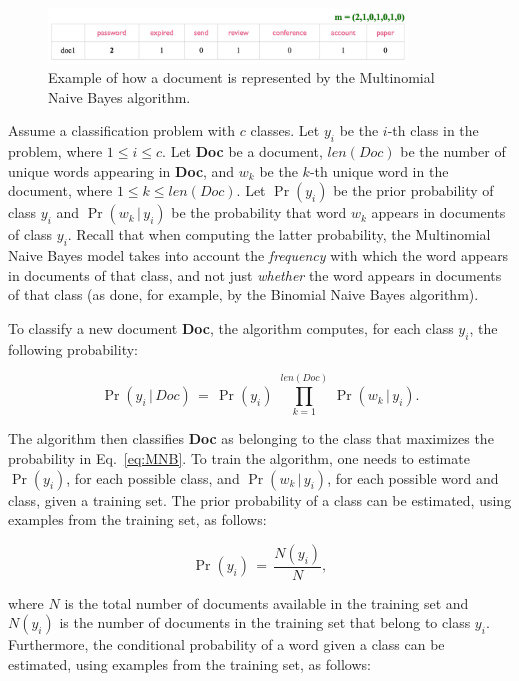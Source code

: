 \documentclass[letterpaper]{article}
\begin{document}
    \begin{figure}[h!!!]
        \centering
        \includegraphics[width=0.85\textwidth]{figures/multinomial_repr.png}
        \caption{Example of how a document is represented by the Multinomial Naive Bayes algorithm.}
        \label{fig:multinomial_repr.png}
    \end{figure}

Assume a classification problem with $c$ classes. Let $y_i$ be the $i$-th class in the problem, where $1 \leq i \leq c$. Let \textbf{Doc} be a document, $len(Doc)$ be the number of unique words appearing in \textbf{Doc}, and $w_k$ be the $k$-th unique word in the document, where $1 \leq k \leq len(Doc)$. Let $\Pr(y_i)$ be the prior probability of class $y_i$ and $\Pr(w_k \, | \, y_i)$ be the probability that word $w_k$ appears in documents of class $y_i$. Recall that when computing the latter probability, the Multinomial Naive Bayes model takes into account the \textit{frequency} with which the word appears in documents of that class, and not just \textit{whether} the word appears in documents of that class (as done, for example, by the Binomial Naive Bayes algorithm).

To classify a new document \textbf{Doc}, the algorithm computes, for each class $y_i$, the following probability:

\begin{equation}
    \Pr(y_i \, | \, Doc) \, = \, \Pr(y_i) \,\, \prod_{k=1}^{len(Doc)} \, \Pr(w_k \, | \, y_i).
    \label{eq:MNB}
\end{equation}

\noindent The algorithm then classifies \textbf{Doc} as belonging to the class that maximizes the probability in Eq.~\eqref{eq:MNB}.
%
To train the algorithm, one needs to estimate $\Pr(y_i)$, for each possible class, and $\Pr(w_k \, | \, y_i)$, for each possible word and class, given a training set. The prior probability of a class can be estimated, using examples from the training set, as follows:

\begin{equation}
\Pr(y_i) \, = \,\frac{N(y_i)}{N},
\end{equation}

\noindent where $N$ is the total number of documents available in the training set and $N(y_i)$ is the number of documents in the training set that belong to class $y_i$. Furthermore, the conditional probability of a word given a class can be estimated, using examples from the training set, as follows:
\end{document}
